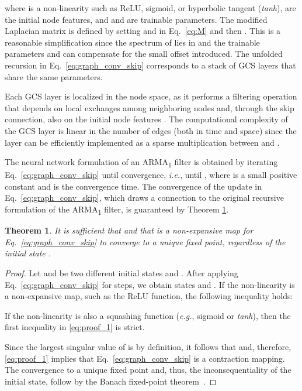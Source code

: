 \documentclass{article}
\newtheorem{theorem}{Theorem}
\begin{document}
where  is a non-linearity such as ReLU, sigmoid, or hyperbolic tangent (\emph{tanh}),  are the initial node features, and  and  are trainable parameters.
The modified Laplacian matrix  is defined by setting  and  in Eq.~\eqref{eq:M} and then . 
This is a reasonable simplification since the spectrum of  lies in  and the trainable parameters  and  can compensate for the small offset introduced.
The unfolded recursion in Eq.~\eqref{eq:graph_conv_skip} corresponds to a stack of GCS layers that share the same parameters.

Each GCS layer is localized in the node space, as it performs a filtering operation that depends on local exchanges among neighboring nodes and, through the skip connection, also on the initial node features .
The computational complexity of the GCS layer is linear in the number of edges (both in time and space) since the layer can be efficiently implemented as a sparse multiplication between  and .

The neural network formulation of an ARMA\textsubscript{1} filter is obtained by iterating Eq.~\eqref{eq:graph_conv_skip} until convergence, \emph{i.e.}, until , where  is a small positive constant and  is the convergence time.
The convergence of the update in Eq.~\eqref{eq:graph_conv_skip}, which draws a connection to the original recursive formulation of the ARMA\textsubscript{1} filter, is guaranteed by Theorem \ref{th:1}.

\begin{theorem}
\label{th:1}
It is sufficient that  and that  is a non-expansive map for Eq.~\eqref{eq:graph_conv_skip} to converge to a unique fixed point, regardless of the initial state .
\end{theorem}

\begin{proof}
Let  and  be two different initial states and .
After applying Eq.~\eqref{eq:graph_conv_skip} for  steps, we obtain states  and .
If the non-linearity  is a non-expansive map, such as the ReLU function, the following inequality holds:



If the non-linearity  is also a squashing function (\emph{e.g.}, sigmoid or \textit{tanh}), then the first inequality in \eqref{eq:proof_1} is strict.

Since the largest singular value of  is  by definition, it follows that  and, therefore, \eqref{eq:proof_1} implies that Eq.~\eqref{eq:graph_conv_skip} is a contraction mapping.
The convergence to a unique fixed point and, thus, the inconsequentiality of the initial state, follow by the Banach fixed-point theorem~\cite{goebel1972fixed}.
\end{proof}
\end{document}
